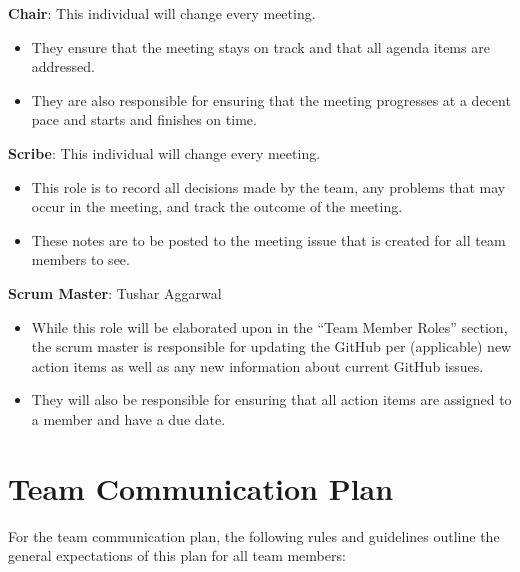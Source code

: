 \documentclass{article}
\begin{document}
\begin{itemize}
\begin{item}
\textbf{Chair}: This individual will change every meeting.
\begin{itemize}
\item They ensure that the meeting stays on track and that all agenda items are addressed.
\item They are also responsible for ensuring that the meeting progresses at a decent pace and starts and finishes on time.
\end{itemize}
\end{item}
\begin{item}
\textbf{Scribe}: This individual will change every meeting.
\begin{itemize}
\item This role is to record all decisions made by the team, any problems that may occur in the meeting, and track the outcome of the meeting.
\item These notes are to be posted to the meeting issue that is created for all team members to see.
\end{itemize}
\end{item}
\begin{item}
\textbf{Scrum Master}: Tushar Aggarwal
\begin{itemize}
\item While this role will be elaborated upon in the ``Team Member Roles'' section, the scrum master is responsible for updating the GitHub per (applicable) new action items as well as any new information about current GitHub issues.
\item They will also be responsible for ensuring that all action items are assigned to a member and have a due date.
\end{itemize}
\end{item}
\end{itemize}

\section{Team Communication Plan}

For the team communication plan, the following rules and guidelines outline the general expectations of this plan for all team members: 
\end{document}

